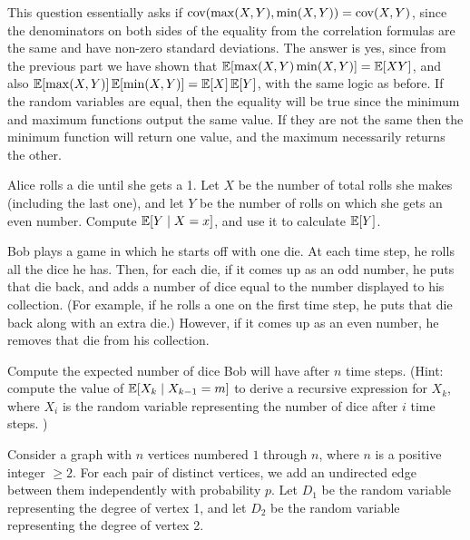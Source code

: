 \documentclass[11pt]{article}
\begin{document}
\begin{solution}
\begin{Parts}
\Part This question essentially asks if $\operatorname{cov}(\max(X, Y), \min(X, Y)) = \operatorname{cov}(X, Y)$,
since the denominators on both sides of the equality from the correlation 
formulas are the same and have non-zero standard deviations. The answer is yes, 
since from the previous part we have shown that $\operatorname{\mathbb{E}}[\max (X, Y) \min (X, Y)] = 
\operatorname{\mathbb{E}}[XY]$, and also $\operatorname{\mathbb{E}}[\max(X,Y)]\operatorname{\mathbb{E}}[\min(X,Y)] = \operatorname{\mathbb{E}}[X]\operatorname{\mathbb{E}}[Y]$, with the same logic
as before. If the random variables are equal, then the equality will be true since
the minimum and maximum functions output the same value. If they are not the same
then the minimum function will return one value, and the maximum necessarily
returns the other. 

\end{Parts}
	
\end{solution}


\begin{Parts}

\Part Alice rolls a die until she gets a 1. Let $X$ be the number of total rolls she makes (including the last one), and let $Y$ be the number of rolls on which she gets an even number. Compute $\operatorname{\mathbb{E}}[Y \mid X = x]$, and use it to calculate $\operatorname{\mathbb{E}}[Y]$. 

\Part Bob plays a game in which he starts off with one die. At each time step, he rolls all the dice he has. Then, for each die, if it comes up as an odd number, he puts that die back, and adds a number of dice equal to the number displayed to his collection. (For example, if he rolls a one on the first time step, he puts that die back along with an extra die.) However, if it comes up as an even number, he removes that die from his collection.

Compute the expected number of dice Bob will have after $n$ time steps. (Hint: compute the value of $\operatorname{\mathbb{E}}[X_k \mid X_{k-1} = m]$ to derive a recursive expression for $X_k$, where $X_i$ is the random variable representing the number of dice after $i$ time steps. )
\end{Parts}

Consider a graph with $n$ vertices numbered $1$ through $n$, where $n$ is a positive integer $\ge 2$. For each pair of distinct vertices, we add an undirected edge between them independently with probability $p$. Let $D_1$ be the random variable representing the degree of vertex 1, and let $D_2$ be the random variable representing the degree of vertex 2. 
\end{document}
